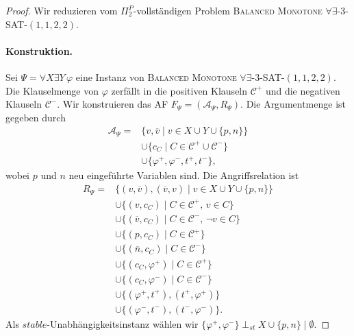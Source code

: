 \begin{proof}
    Wir reduzieren vom \(\Pi_2^P\)-vollständigen Problem
    \textsc{Balanced Monotone \(\forall\exists\)-3-SAT-\((1,1,2,2)\)}.

    \paragraph{Konstruktion.}
Sei
\(
    \Psi=\forall X\exists Y\,\varphi
\)
eine Instanz von \textsc{Balanced Monotone \(\forall\exists\)-3-SAT-\((1,1,2,2)\)}.
Die Klauselmenge von \(\varphi\) zerfällt in die positiven Klauseln
\(\mathcal{C}^{+}\) und die negativen Klauseln \(\mathcal{C}^{-}\).
Wir konstruieren das AF
\(
    F_{\Psi}=(\mathcal{A}_{\Psi},R_{\Psi}).
\)
Die Argumentmenge ist gegeben durch
\[
\begin{aligned}
    \mathcal{A}_{\Psi}
    ={}&
    \{v,\overline{v}\mid v\in X\cup Y\cup\{p,n\}\}\\
    &\cup
    \{c_C\mid C\in\mathcal{C}^{+}\cup\mathcal{C}^{-}\}\\
    &\cup
    \{\varphi^{+},\varphi^{-},t^{+},t^{-}\},
\end{aligned}
\]
wobei \(p\) und \(n\) neu eingeführte Variablen sind.
Die Angriffsrelation ist
\[
\begin{aligned}
    R_{\Psi}
    ={}&
    \{(v,\overline{v}),(\overline{v},v)
        \mid v\in X\cup Y\cup\{p,n\}\}\\
    &\cup
    \{(v,c_C)
        \mid C\in\mathcal{C}^{+},\,v\in C\}\\
    &\cup
    \{(\overline{v},c_C)
        \mid C\in\mathcal{C}^{-},\,\neg v\in C\}\\
    &\cup
    \{(p,c_C)\mid C\in\mathcal{C}^{+}\}\\
    &\cup
    \{(\overline{n},c_C)\mid C\in\mathcal{C}^{-}\}\\
    &\cup
    \{(c_C,\varphi^{+})\mid C\in\mathcal{C}^{+}\}\\
    &\cup
    \{(c_C,\varphi^{-})\mid C\in\mathcal{C}^{-}\}\\
    &\cup
    \{(\varphi^{+},t^{+}),(t^{+},\varphi^{+})\}\\
    &\cup
    \{(\varphi^{-},t^{-}),(t^{-},\varphi^{-})\}.
\end{aligned}
\]
Als \(stable\)-Unabhängigkeitsinstanz wählen wir
\(\{\varphi^{+},\varphi^{-}\} \perp_{st} X \cup \{p,n\} \mid \emptyset\).


\end{proof}
